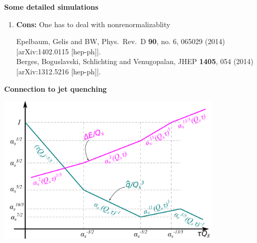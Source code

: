 \documentclass[9pt,a4paper,unknownkeysallowed,xcolor=dvipsnames,aspectratio=43]{beamer}
\begin{document}
\begin{frame}{\bf\huge Some detailed simulations}
\begin{enumerate}
\begin{center}
{{}}
\end{center} 
    \item{\large {\bf Cons:} One has to deal with nonrenormalizablity}
        \begin{center}
    {\tiny  {\color{teablue}
  Epelbaum, Gelis and BW,
  Phys.\ Rev.\ D {\bf 90}, no. 6, 065029 (2014)
  [arXiv:1402.0115 [hep-ph]].\\
    Berges, Boguslavski, Schlichting and Venugopalan,
  JHEP {\bf 1405}, 054 (2014)
  [arXiv:1312.5216 [hep-ph]].
}}
\end{center} 
\end{enumerate}

\end{frame}
%
%
\begin{frame}{\bf\huge Connection to jet quenching}	\vspace{2mm}
\begin{center}
\includegraphics[width=0.8\textwidth]{fig/qhatInBottomUp}
\end{center}
\end{frame}
%
%
\end{document}
